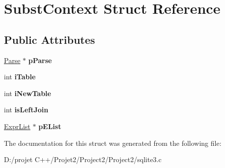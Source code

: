 \hypertarget{struct_subst_context}{}\section{Subst\+Context Struct Reference}
\label{struct_subst_context}
\subsection*{Public Attributes}
\begin{DoxyCompactItemize}
\item 
\mbox{\label{struct_subst_context_aea8056722d58fbcdb342cbfad7422ad4}} 
\mbox{\hyperlink{struct_parse}{Parse}} $\ast$ {\bfseries p\+Parse}
\item 
\mbox{\label{struct_subst_context_a453efa99ce17dbce235117d5e46dd6f7}} 
int {\bfseries i\+Table}
\item 
\mbox{\label{struct_subst_context_a828f6ffc3b5266cbedc16e149fb0cd19}} 
int {\bfseries i\+New\+Table}
\item 
\mbox{\label{struct_subst_context_a49733a7875355a0a0c84fd182233b1a1}} 
int {\bfseries is\+Left\+Join}
\item 
\mbox{\label{struct_subst_context_a43336e8c2442bac062bc96e1a0674a95}} 
\mbox{\hyperlink{struct_expr_list}{Expr\+List}} $\ast$ {\bfseries p\+E\+List}
\end{DoxyCompactItemize}


The documentation for this struct was generated from the following file\+:\begin{DoxyCompactItemize}
\item 
D\+:/projet C++/\+Projet2/\+Project2/\+Project2/sqlite3.\+c\end{DoxyCompactItemize}

